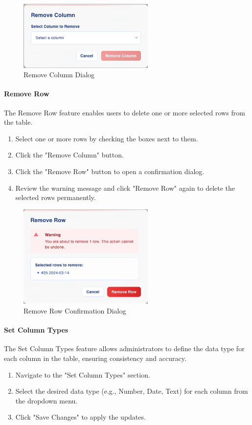 \documentclass[12pt]{article}
\begin{document}
\begin{figure}[H]
    \centering
    \includegraphics[width=0.6\textwidth]{./Diagrams/RemoveColumn.png}
    \caption{Remove Column Dialog}
\end{figure}

\paragraph{Remove Row}
The Remove Row feature enables users to delete one or more selected rows from
the table.
\begin{enumerate}
    \item Select one or more rows by checking the boxes next to them.
    \item Click the "Remove Column" button.
    \item Click the "Remove Row" button to open a confirmation dialog.
    \item Review the warning message and click "Remove Row" again to delete the
    selected rows permanently.
\end{enumerate}

\begin{figure}[H]
    \centering
    \includegraphics[width=0.6\textwidth]{./Diagrams/RemoveRowWithSelectedRow.png}
    \caption{Remove Row Confirmation Dialog}
\end{figure}

\paragraph{Set Column Types}
The Set Column Types feature allows administrators to define the data type for
each column in the table, ensuring consistency and accuracy.
\begin{enumerate}
    \item Navigate to the "Set Column Types" section.
    \item Select the desired data type (e.g., Number, Date, Text) for each
    column from the dropdown menu.
    \item Click "Save Changes" to apply the updates.
\end{enumerate}
\end{document}
